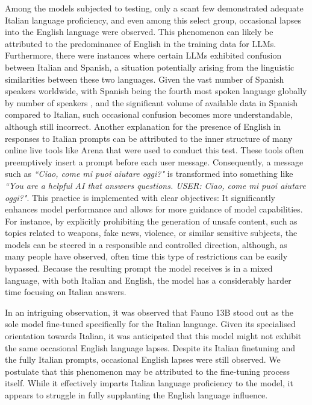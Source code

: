 Among the models subjected to testing, only a scant few demonstrated adequate Italian language proficiency, and even among this select group, occasional lapses into the English language were observed. This phenomenon can likely be attributed to the predominance of English in the training data for LLMs. Furthermore, there were instances where certain LLMs exhibited confusion between Italian and Spanish, a situation potentially arising from the linguistic similarities between these two languages. Given the vast number of Spanish speakers worldwide, with Spanish being the fourth most spoken language globally by number of speakers \cite{spanish-speakers}, and the significant volume of available data in Spanish compared to Italian, such occasional confusion becomes more understandable, although still incorrect.
Another explanation for the presence of English in responses to Italian prompts can be attributed to the inner structure of many online live tools like Arena \cite{arena} that were used to conduct this test. These tools often preemptively insert a prompt before each user message. Consequently, a message such as \emph{``Ciao, come mi puoi aiutare oggi?"} is transformed into something like \emph{``You are a helpful AI that answers questions. USER: Ciao, come mi puoi aiutare oggi?"}. This practice is implemented with clear objectives: It significantly enhances model performance and allows for more guidance of model capabilities. For instance, by explicitly prohibiting the generation of unsafe content, such as topics related to weapons, fake news, violence, or similar sensitive subjects, the models can be steered in a responsible and controlled direction, although, as many people have observed, often time this type of restrictions can be easily bypassed. Because the resulting prompt the model receives is in a mixed language, with both Italian and English, the model has a considerably harder time focusing on Italian answers.

In an intriguing observation, it was observed that Fauno 13B \cite{fauno} stood out as the sole model fine-tuned specifically for the Italian language. Given its specialised orientation towards Italian, it was anticipated that this model might not exhibit the same occasional English language lapses. Despite its Italian finetuning and the fully Italian prompts, occasional English lapses were still observed. We postulate that this phenomenon may be attributed to the fine-tuning process itself. While it effectively imparts Italian language proficiency to the model, it appears to struggle in fully supplanting the English language influence.

